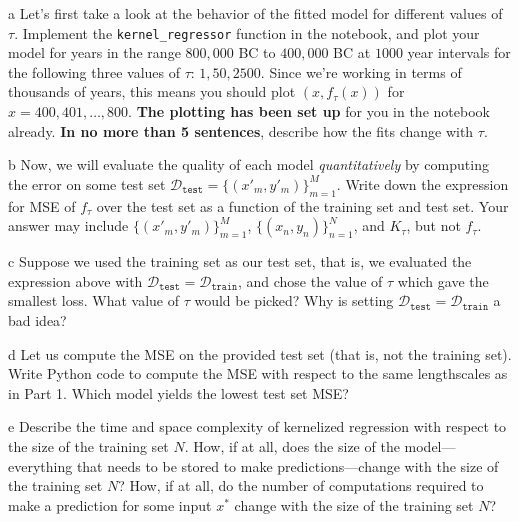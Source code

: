\documentclass[expanded]{lkx_pset}
\begin{document}
\begin{parts}
  \begin{part}{a}
    Let's first take a look at the behavior of the fitted model for different values of $\tau$. Implement the \texttt{kernel\_regressor} function in the notebook, and plot your model for years in the range $800,000$ BC to $400,000$ BC at $1000$ year intervals for the following three values of $\tau$: $1, 50, 2500$. 
    Since we're working in terms of thousands of years, this means you should plot $(x, f_\tau(x))$ for $x = 400, 401, \dots, 800$. \textbf{The plotting has been set up} for you in the notebook already. \textbf{In no more than 5 sentences}, describe how the fits change with $\tau$.
  \end{part}

  \begin{part}{b} 
    Now, we will evaluate the quality of each model \emph{quantitatively} by computing the error on some test set $\mathcal{D}_\texttt{test} = \{(x'_m, y'_m)\}_{m = 1} ^M$.  Write down the expression for MSE of $f_\tau$ over the test set as a function of the training set and test set. Your answer may include $\{(x'_m, y'_m)\}_{m = 1} ^M$, $\{(x_n, y_n)\}_{n = 1} ^N$, and $K_\tau$, but not $f_\tau$.
  \end{part}

  \begin{part}{c}
    Suppose we used the training set as our test set, that is, we evaluated the expression above with $\mathcal{D}_\texttt{test} = \mathcal{D}_\texttt{train}$, and chose the value of $\tau$ which gave the smallest loss.  What value of $\tau$ would be picked?  Why is setting $\mathcal{D}_\texttt{test} = \mathcal{D}_\texttt{train}$ a bad idea?
  \end{part}


  \begin{part}{d}
    Let us compute the MSE on the provided test set (that is, not the training set). Write Python code to compute the MSE with respect to the same lengthscales as in Part 1. Which model yields the lowest test set MSE? 
  \end{part}

  \begin{part}{e}
    Describe the time and space complexity of kernelized regression with respect to the size of the training set $N$. 
    How, if at all, does the size of the model---everything that needs to be stored to make predictions---change with the size of the training set $N$? 
    How, if at all, do the number of computations required to make a prediction for some input $x^*$ change with the size of the training set $N$?
  \end{part}
\end{parts}
\end{document}
